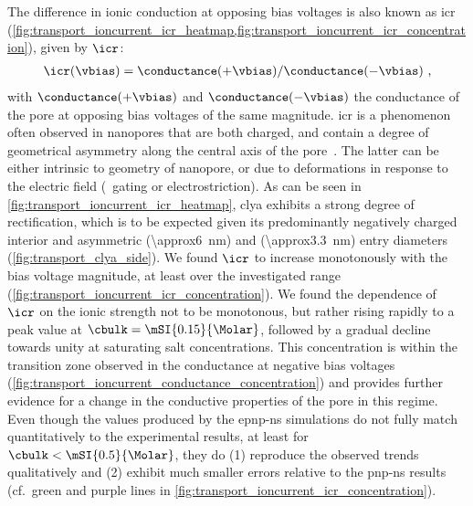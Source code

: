 The difference in ionic conduction at opposing bias voltages is also known as \gls{icr}
(\cref{fig:transport_ioncurrent_icr_heatmap,fig:transport_ioncurrent_icr_concentration}), given by $\icr$:
%
\begin{align}\label{eq:icr}
  \icr(\vbias) = \conductance(+\vbias) / \conductance(-\vbias)
  \text{ ,}
\end{align}
%
with $\conductance(+\vbias)$ and $\conductance(-\vbias)$ the conductance of the pore at opposing bias voltages
of the same magnitude. \gls{icr} is a phenomenon often observed in nanopores that are both charged, and
contain a degree of geometrical asymmetry along the central axis of the
pore~\cite{Constantin-2007,White-2008,Wang-2014}. The latter can be either intrinsic to geometry of nanopore,
or due to deformations in response to the electric field (\ie~gating or electrostriction). As can be seen in
\cref{fig:transport_ioncurrent_icr_heatmap}, \gls{clya} exhibits a strong degree of rectification, which is to
be expected given its predominantly negatively charged interior and asymmetric \cisi{} (\SI{\approx6}{\nm})
and \transi{} (\SI{\approx3.3}{\nm}) entry diameters (\cref{fig:transport_clya_side}). We found $\icr$ to
increase monotonously with the bias voltage magnitude, at least over the investigated range
(\cref{fig:transport_ioncurrent_icr_concentration}). We found the dependence of $\icr$ on the ionic strength
not to be monotonous, but rather rising rapidly to a peak value at $\cbulk=\mSI{0.15}{\Molar}$, followed by a
gradual decline towards unity at saturating salt concentrations. This concentration is within the transition
zone observed in the conductance at negative bias voltages
(\cref{fig:transport_ioncurrent_conductance_concentration}) and provides further evidence for a change in the
conductive properties of the pore in this regime. Even though the values produced by the \gls{epnp-ns}
simulations do not fully match quantitatively to the experimental results, at least for $\cbulk <
\text{\mSI{0.5}{\Molar}}$, they do (1) reproduce the observed trends qualitatively and (2) exhibit much
smaller errors relative to the \gls{pnp-ns} results (cf.~green and purple lines in
\cref{fig:transport_ioncurrent_icr_concentration}).

